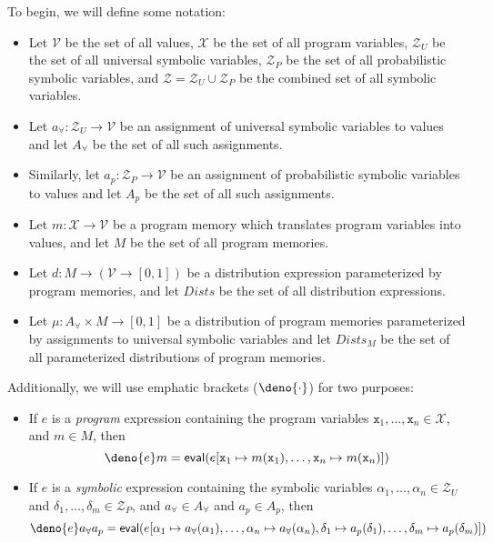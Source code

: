 \documentclass[acmsmall,review,anonymous]{acmart}\settopmatter{printfolios=true,printccs=false,printacmref=false}
\begin{document}
To begin, we will define some notation: 
\begin{itemize}
\item Let $\mathcal{V}$ be the set of all values, $\mathcal{X}$ be the set of all program variables, $\mathcal{Z}_U$ be the set of all universal symbolic variables, $\mathcal{Z}_P$ be the set of all probabilistic symbolic variables, and $\mathcal{Z} = \mathcal{Z}_U \cup \mathcal{Z}_P$ be the combined set of all symbolic variables.
\item Let $a_{\forall}: \mathcal{Z}_U \rightarrow \mathcal{V}$ be an assignment of universal symbolic variables to values and let $\mathit{A}_{\forall}$ be the set of all such assignments.
\item Similarly, let $a_p : \mathcal{Z}_P \rightarrow \mathcal{V}$ be an assignment of probabilistic symbolic variables to values and let $\mathit{A}_p$ be the set of all such assignments.
\item Let $m : \mathcal{X} \rightarrow \mathcal{V}$ be a program memory which translates program variables into values, and let $\mathit{M}$ be the set of all program memories.
\item Let $d : \mathit{M} \rightarrow (\mathcal{V} \rightarrow [0,1])$ be a distribution expression parameterized by program memories, and let $\mathit{Dists}$ be the set of all distribution expressions.
\item Let $\mu : \mathit{A}_{\forall} \times \mathit{M} \rightarrow [0,1]$ be a distribution of program memories parameterized by assignments to universal symbolic variables and let $\mathit{Dists_M}$ be the set of all parameterized distributions of program memories.
\end{itemize}

Additionally, we will use emphatic brackets ($\deno{\cdot}$) for two purposes:
\begin{itemize}
\item If $e$ is a \textit{program} expression containing the program variables $\mathtt{x}_1,\ldots,\mathtt{x}_n \in \mathcal{X}$, and $m \in \mathit{M}$, then
  \[
    \deno{e}m = \mathsf{eval}(e[\mathtt{x}_1 \mapsto m(\mathtt{x}_1),\ldots,\mathtt{x}_n \mapsto m(\mathtt{x}_n)])
  \]
\item If $e$ is a \textit{symbolic} expression containing the symbolic variables $\alpha_1,\ldots,\alpha_n \in \mathcal{Z}_U$ and $\delta_1,\ldots,\delta_m \in \mathcal{Z}_P$, and $a_{\forall} \in \mathit{A}_{\forall}$ and $a_p \in \mathit{A}_p$, then
  \[
    \deno{e}a_{\forall}a_p = \mathsf{eval}(e[\alpha_1\mapsto a_{\forall}(\alpha_1),\ldots,\alpha_n \mapsto a_{\forall}(\alpha_n), \delta_1 \mapsto a_p(\delta_1), \ldots, \delta_m \mapsto a_p(\delta_m)])
  \]
\end{itemize}
\end{document}
